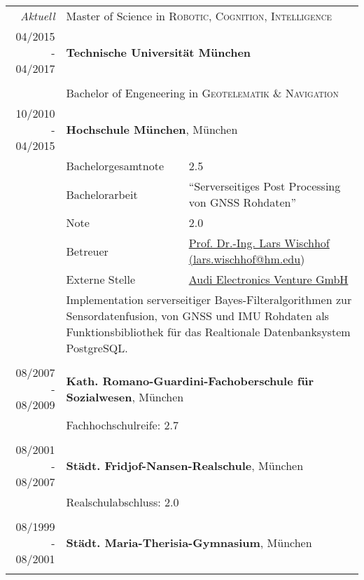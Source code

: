 \documentclass[a4paper,10pt]{article} %
\begin{document}
\begin{tabular}{r|l@{: }p{11cm}}
\emph{Aktuell} & \multicolumn{2}{p{11cm}}{Master of Science in \textsc{Robotic, Cognition, Intelligence}}\\
\textsc{04/2015 - 04/2017} & \multicolumn{2}{p{11cm}}{\textbf{Technische Universität München}}\\
\multicolumn{3}{c}{}\\
& \multicolumn{2}{p{11cm}}{Bachelor of Engeneering in \textsc{Geotelematik \& Navigation}}\\
\textsc{10/2010 - 04/2015} & \multicolumn{2}{p{11cm}}{\textbf{Hochschule München}, München} \\
                           & \small Bachelorgesamtnote & \small  2.5\\
                           & \small Bachelorarbeit & \small ``Serverseitiges Post Processing von GNSS Rohdaten'' \\
                           & \small Note           & \small 2.0\\
			                     & \small Betreuer       & \small \href{mailto:lars.wischhof@hm.edu}{Prof. Dr.-Ing. Lars Wischhof (lars.wischhof@hm.edu}) \\
                           & \small Externe Stelle & \small \href{http://www.audi-electronics-venture.de}{Audi Electronics Venture GmbH} \\
                           & \multicolumn{2}{p{11cm}}{\small Implementation serverseitiger Bayes-Filteralgorithmen zur Sensordatenfusion, von GNSS und IMU Rohdaten als Funktionsbibliothek für das Realtionale Datenbanksystem PostgreSQL.}\\
\multicolumn{3}{c}{}\\
 
 
\textsc{08/2007 - 08/2009} & \multicolumn{2}{p{11cm}}{\textbf{Kath. Romano-Guardini-Fachoberschule für Sozialwesen}, München} \\
                           & \multicolumn{2}{p{11cm}}{\small Fachhochschulreife: 2.7}                                         \\
\multicolumn{3}{c}{}                                                                                \\
 
 
\textsc{08/2001 - 08/2007} & \multicolumn{2}{p{11cm}}{\textbf{Städt. Fridjof-Nansen-Realschule}, München} \\
                           & \multicolumn{2}{p{11cm}}{\small Realschulabschluss: 2.0} \\
\multicolumn{3}{c}{}\\
 
 
\textsc{08/1999 - 08/2001} & \multicolumn{2}{p{11cm}}{\textbf{Städt. Maria-Therisia-Gymnasium}, München} \\
\multicolumn{3}{c}{}\\
\end{tabular}
 
\end{document}
